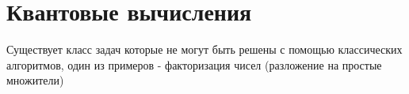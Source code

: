\chapter{Квантовые вычисления}
Существует класс задач которые не могут быть решены с помощью
классических алгоритмов, один из примеров - факторизация чисел
(разложение на простые множители)












